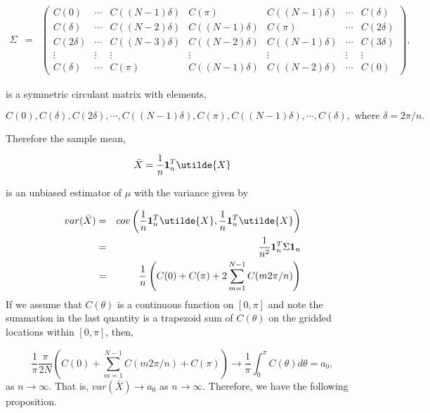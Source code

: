 \begin{eqnarray*}
	\Sigma &=& \left(\begin{array}{ccccccc}
	C(0)      & \cdots & C((N-1)\delta ) & C(\pi) &  C((N-1)\delta ) & \cdots & C(\delta) \\
	C(\delta) & \cdots & C((N-2)\delta) & C((N-1)\delta) &  C(\pi)  & \cdots & C(2\delta) \\
	C(2\delta) & \cdots & C((N-3)\delta) & C((N-2)\delta) &  C((N-1)\delta) & \cdots & C(3\delta)\\
	\vdots    & \vdots  & \vdots  & \vdots  & \vdots  & \vdots  & \vdots  \\
	C(\delta) & \cdots & C(\pi) &  C((N-1)\delta) & C((N-2)\delta)  & \cdots & C(0)
	\end{array} \right),
\end{eqnarray*}

\noi is a symmetric circulant matrix with elements, 

\[
C(0),C(\delta), C(2\delta), \cdots, C((N-1)\delta), C(\pi),  C((N-1)\delta), \cdots, C(\delta), \mbox{ where } \delta = 2\pi/n.
\]

Therefore the sample mean, 

\[
\bar{X} = \frac{1}{n}{\bf 1}_n^T \utilde{X}
\]

is an unbiased estimator of $\mu$ with the variance given by

\begin{eqnarray*}
var(\bar{X}) &=& cov\left(\frac{1}{n}{\bf 1}_n^T \utilde{X}, \frac{1}{n}{\bf 1}_n^T \utilde{X}\right) \nonumber \\
	&=& \frac{1}{n^2}{\bf 1}_n^T \Sigma {\bf 1}_n \nonumber \\
	&=& \frac{1}{n} \left(C(0)+C(\pi)+2 \sum_{m=1}^{N-1}C(m 2\pi/n)\right) \nonumber
\end{eqnarray*}
If we assume that $C(\theta)$ is a continuous function on $[0, \pi]$ and note the summation in the last quantity is a trapezoid sum of $C(\theta)$ on the gridded locations within $[0, \pi]$, then,

\[
\frac{1}{\pi} \frac{\pi}{2 N} \left(C(0) + \sum_{m=1}^{N-1}C(m 2\pi/n) + C(\pi) \right) \to \frac{1}{\pi} \int_0^\pi C(\theta)d\theta = a_0,
\]
as $n \to \infty$. That is, $var(\bar{X}) \to a_0$ as $n \to \infty$. Therefore, we have the following proposition. \\



